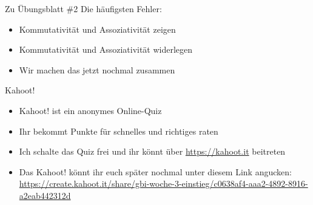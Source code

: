 \begin{frame}{Zu Übungsblatt \#2}
	Die häufigsten Fehler:
	\begin{itemize}[<+->]
		\item Kommutativität und Assoziativität zeigen
		\item Kommutativität und Assoziativität widerlegen
		\item Wir machen das jetzt nochmal zusammen
	\end{itemize}
\end{frame}

\framePrevEpisode

\begin{frame}{Kahoot!}
	\begin{itemize}[<+->]
		\item Kahoot! ist ein anonymes Online-Quiz
		\item Ihr bekommt Punkte für schnelles und richtiges raten
		\item Ich schalte das Quiz frei und ihr könnt über \url{https://kahoot.it} beitreten
		\item Das Kahoot! könnt ihr euch später nochmal unter diesem Link angucken: \\
			\url{https://create.kahoot.it/share/gbi-woche-3-einstieg/c0638af4-aaa2-4892-8916-a2eab442312d}
	\end{itemize}
\end{frame}





